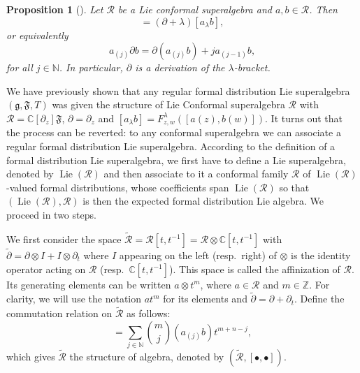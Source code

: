 \documentclass[a4paper, 12pt, reqno]{amsart}
\newtheorem{proposition}[theorem]{Proposition}
\theoremstyle{remark}
\numberwithin{equation}{subsection}
\DeclareMathOperator{\Lie}{Lie}
\begin{document}
\begin{proposition}[{\cite[Remark 2.5.3]{nozaradan_introduction_2008}}]
  \label{prp:3}
  Let $\mathcal{R}$ be a Lie conformal superalgebra and $a, b \in \mathcal{R}$.
  Then
  \begin{equation*}
    [a_{\lambda}\partial b] = (\partial + \lambda)[a_{\lambda}b],
  \end{equation*}
  or equivalently
  \begin{equation*}
    a_{(j)}\partial b = \partial(a_{(j)}b) + ja_{(j - 1)}b,
  \end{equation*}
  for all $j \in \mathbb{N}$.
  In particular, $\partial$ is a derivation of the $\lambda$-bracket.
\end{proposition}

We have previously shown that any regular formal distribution Lie superalgebra $(\mathfrak{g}, \mathfrak{F}, T)$ was given the structure of Lie Conformal superalgebra $\mathcal{R}$ with $\mathcal{R} = \mathbb{C}[\partial_z]\mathfrak{F}$, $\partial = \partial_z$ and $[a_{\lambda}b] = F^{\lambda}_{z, w}([a(z), b(w)])$.
It turns out that the process can be reverted: to any conformal superalgebra we can associate a regular formal distribution Lie superalgebra.
According to the definition of a formal distribution Lie superalgebra, we first have to define a Lie superalgebra, denoted by $\Lie(\mathcal{R})$ and then associate to it a conformal family $\mathcal{R}$ of $\Lie(\mathcal{R})$-valued formal distributions, whose coefficients span $\Lie(\mathcal{R})$ so that $(\Lie(\mathcal{R}), \mathcal{R})$ is then the expected formal distribution Lie algebra.
We proceed in two steps.

We first consider the space $\widetilde{\mathcal{R}} = \mathcal{R}[t, t^{-1}] = \mathcal{R}\otimes\mathbb{C}[t, t^{-1}]$ with $\widetilde{\partial} = \partial \otimes I + I \otimes \partial_t$ where $I$ appearing on the left (resp.\ right) of $\otimes$ is the identity operator acting on $\mathcal{R}$ (resp.\ $\mathbb{C}[t, t^{-1}]$).
This space is called the affinization of $\mathcal{R}$.
Its generating elements can be written $a\otimes t^m$, where $a \in \mathcal{R}$ and $m \in \mathbb{Z}$.
For clarity, we will use the notation $at^m$ for its elements and $\widetilde{\partial} = \partial + \partial_t$.
Define the commutation relation on $\widetilde{\mathcal{R}}$ as follows:
\begin{equation*}
  [at^m, bt^n] = \sum_{j \in \mathbb{N}}\binom{m}{j}(a_{(j)}b)t^{m + n - j},
\end{equation*}
which gives $\widetilde{\mathcal{R}}$ the structure of algebra, denoted by $(\widetilde{\mathcal{R}},[\bullet, \bullet])$.
\end{document}
